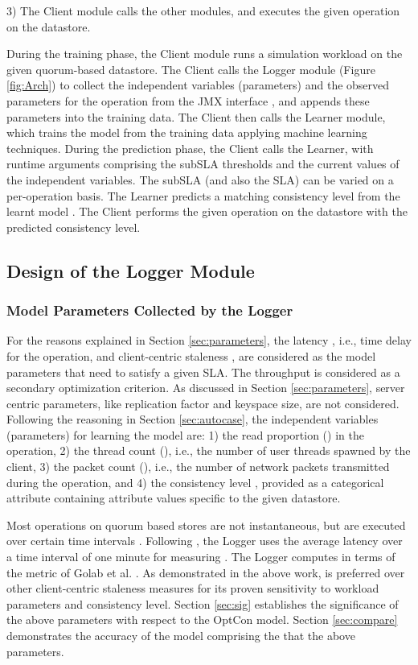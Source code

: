 \documentclass[conference]{IEEEtran}
\begin{document}
    3) The Client module calls the other modules, and executes the given operation on the datastore.
\par During the training phase, the Client module runs a simulation workload on the given quorum-based datastore. The Client calls the Logger module (Figure \ref{fig:Arch}) to collect the independent variables (parameters) and the observed parameters for the operation from the JMX interface \cite{Lakshman:2010:CDS:1773912.1773922}, and appends these parameters into the training data. The Client then calls the Learner module, which trains the model  from the training data applying machine learning techniques.
During the prediction phase, the Client calls the Learner, with runtime arguments comprising the subSLA thresholds and the current values of the independent variables.
   The subSLA (and also the SLA) can be varied on a per-operation basis. The Learner predicts a matching consistency level from the learnt model . The Client performs the given operation on the datastore with the predicted consistency level.


\subsection{Design of the Logger Module}\label{sec:logdes}

  \subsubsection{Model Parameters Collected by the Logger}\label{sec:logparam}
For the reasons explained in Section \ref{sec:parameters}, the latency , i.e., time delay for the operation, and client-centric staleness , are considered as the model parameters that need to satisfy a given SLA. The throughput  is considered as a secondary optimization criterion. As discussed in Section \ref{sec:parameters}, server centric parameters, like replication factor and keyspace size, are not considered. Following the reasoning in Section \ref{sec:autocase}, the independent variables (parameters) for learning the model  are: 1) the read proportion () in the operation, 2) the thread count (), i.e., the number of user threads spawned by the client, 3) the packet count (), i.e., the number of network packets  transmitted during the operation, and 4) the consistency level , provided as a categorical attribute containing attribute values specific to the given datastore. \par Most operations on quorum based stores are not instantaneous, but are executed over certain time intervals \cite{DBLP:conf/cloud/GolabRAKWG13}. Following  \cite{Bailis:2012:PBS:2212351.2212359}, the Logger uses the average latency over a time  interval of one minute for measuring .
The Logger computes  in terms of the {\boldmath} metric of Golab et al. \cite{DBLP:conf/cloud/GolabRAKWG13}. As demonstrated in the above work, {\boldmath}  is preferred over other client-centric staleness measures for its proven sensitivity to workload parameters and consistency level. Section \ref{sec:sig} establishes the significance of the above parameters with respect to the OptCon model.
  Section \ref{sec:compare} demonstrates the accuracy of the model comprising the that the above parameters. 
\end{document}
